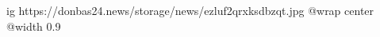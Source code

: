  
 
 
 
 

\ifcmt
  ig https://donbas24.news/storage/news/ezluf2qrxksdbzqt.jpg
  @wrap center
  @width 0.9
\fi
